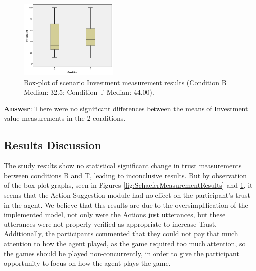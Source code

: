 \begin{figure}[hbt]
    \centering
    \includegraphics[width=180px]{graphs/InvestmentBoxPlot.png}
    \caption{Box-plot of scenario Investment measurement results (Condition B Median: 32.5; Condition T Median: 44.00).}
    \label{fig:InvestmentBoxPlot}
\end{figure}

\textbf{Answer}: There were no significant differences between the means of Investment value measurements in the 2 conditions.

\subsection{Results Discussion}
The study results show no statistical significant change in trust measurements between conditions B and T, leading to inconclusive results. But by observation of the box-plot graphs, seen in Figures \ref{fig:SchaeferMeasurementResults} and \ref{fig:InvestmentBoxPlot}, it seems that the Action Suggestion module had no effect on the participant's trust in the agent.
We believe that this results are due to the oversimplification of the implemented model, not only were the Actions just utterances, but these utterances were not properly verified as appropriate to increase Trust. Additionally, the participants commented that they could not pay that much attention to how the agent played, as the game required too much attention, so the games should be played non-concurrently, in order to give the participant opportunity to focus on how the agent plays the game.